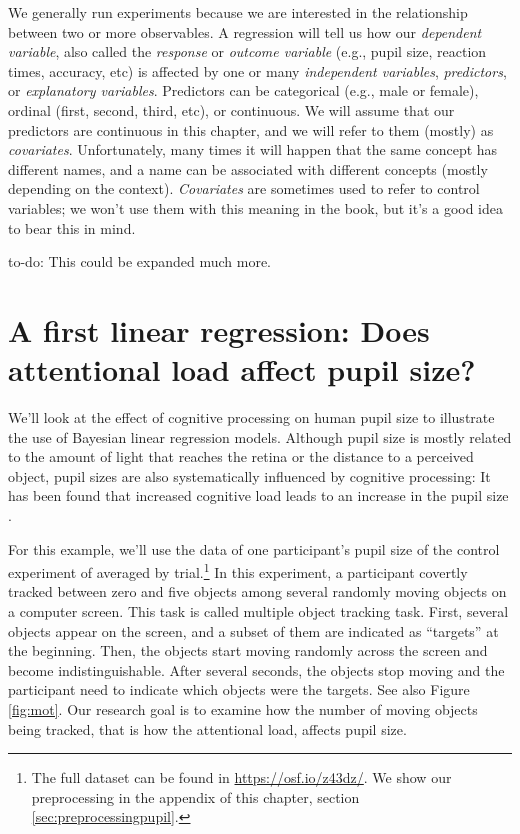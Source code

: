 \documentclass[12pt,]{krantz}
\makeatletter
\newenvironment{kframe}{%
\medskip{}
\setlength{\fboxsep}{.8em}
 \def\at@end@of@kframe{}%
 \ifinner\ifhmode%
  \def\at@end@of@kframe{\end{minipage}}%
  \begin{minipage}{\columnwidth}%
 \fi\fi%
 \def\FrameCommand##1{\hskip\@totalleftmargin \hskip-\fboxsep
 \colorbox{shadecolor}{##1}\hskip-\fboxsep
     \hskip-\linewidth \hskip-\@totalleftmargin \hskip\columnwidth}%
 \MakeFramed {\advance\hsize-\width
   \@totalleftmargin\z@ \linewidth\hsize
   \@setminipage}}%
 {\par\unskip\endMakeFramed%
 \at@end@of@kframe}
\newenvironment{rmdblock}[1]
  {
  \begin{itemize}
  \renewcommand{\labelitemi}{
    \raisebox{-.7\height}[0pt][0pt]{
      {\setkeys{Gin}{width=3em,keepaspectratio}\texttt{[image: images/\#1]}}
    }
  }
  \setlength{\fboxsep}{1em}
  \begin{kframe}
  \item
  }
  {
  \end{kframe}
  \end{itemize}
  }
\newenvironment{rmdnote}
  {\begin{rmdblock}{note}}
  {\end{rmdblock}}
\theoremstyle{definition}
\theoremstyle{definition}
\theoremstyle{definition}
\theoremstyle{remark}
\makeatother
\begin{document}
We generally run experiments because we are interested in the relationship between two or more observables. A regression will tell us how our \emph{dependent variable}, also called the \emph{response} or \emph{outcome variable} (e.g., pupil size, reaction times, accuracy, etc) is affected by one or many \emph{independent variables}, \emph{predictors}, or \emph{explanatory variables}. Predictors can be categorical (e.g., male or female), ordinal (first, second, third, etc), or continuous. We will assume that our predictors are continuous in this chapter, and we will refer to them (mostly) as \emph{covariates}. Unfortunately, many times it will happen that the same concept has different names, and a name can be associated with different concepts (mostly depending on the context). \emph{Covariates} are sometimes used to refer to control variables; we won't use them with this meaning in the book, but it's a good idea to bear this in mind.

\begin{rmdnote}
to-do: This could be expanded much more.
\end{rmdnote}

\hypertarget{sec:pupil}{%
\section{A first linear regression: Does attentional load affect pupil size?}\label{sec:pupil}}

We'll look at the effect of cognitive processing on human pupil size to illustrate the use of Bayesian linear regression models. Although pupil size is mostly related to the amount of light that reaches the retina or the distance to a perceived object, pupil sizes are also systematically influenced by cognitive processing: It has been found that increased cognitive load leads to an increase in the pupil size \citep[for a review, see][]{mathotPupillometryPsychologyPhysiology2018}.

For this example, we'll use the data of one participant's pupil size of the control experiment of \citet{wahnPupilSizesScale2016} averaged by trial.\footnote{The full dataset can be found in \url{https://osf.io/z43dz/}. We show our preprocessing in the appendix of this chapter, section \ref{sec:preprocessingpupil}.}
In this experiment, a participant covertly tracked between zero and five objects among several randomly moving objects on a computer screen. This task is called multiple object tracking \citep[or MOT:][]{pylyshynTrackingMultipleIndependent1988} task. First, several objects appear on the screen, and a subset of them are indicated as ``targets'' at the beginning. Then, the objects start moving randomly across the screen and become indistinguishable. After several seconds, the objects stop moving and the participant need to indicate which objects were the targets. See also Figure \ref{fig:mot}. Our research goal is to examine how the number of moving objects being tracked, that is how the attentional load, affects pupil size.
\end{document}
